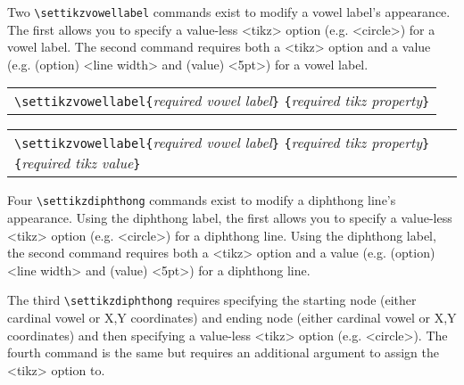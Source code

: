 \documentclass{article}
\newcommand{\pkg}[1]{\texttt{#1}}
\def\\{}%
\def\texttt#1{<#1>}%
\begin{document}
\bigskip
\noindent
Two \verb|\settikzvowellabel| commands exist to modify a vowel label's appearance.  The first allows you to specify a value-less \pkg{tikz} option (e.g. \texttt{circle}) for a vowel label.  The second command requires both a \pkg{tikz} option and a value (e.g. (option) \texttt{line width} and (value) \texttt{5pt}) for a vowel label.
\begin{center}
	\begin{tabular}{l}
		\begin{minipage}[t]{0.85\textwidth}
			{\small
				\verb|\settikzvowellabel{|\textit{required vowel label}\verb|}|\\
				\hspace*{10em}\verb|{|\textit{required tikz property}\verb|}|
			}
		\end{minipage} \\
	\end{tabular}
\end{center}
\begin{center}
	\begin{tabular}{l}
		\begin{minipage}[t]{0.85\textwidth}
			{\small
				\verb|\settikzvowellabel{|\textit{required vowel label}\verb|}|\\
				\hspace*{10em}\verb|{|\textit{required tikz property}\verb|}|\\
				\hspace*{10em}\verb|{|\textit{required tikz value}\verb|}|
			}
		\end{minipage} \\
	\end{tabular}
\end{center}

\bigskip
\noindent
Four \verb|\settikzdiphthong| commands exist to modify a diphthong line's appearance.  Using the diphthong label, the first allows you to specify a value-less \pkg{tikz} option (e.g. \texttt{circle}) for a diphthong line.  Using the diphthong label, the second command requires both a \pkg{tikz} option and a value (e.g. (option) \texttt{line width} and (value) \texttt{5pt}) for a diphthong line.

The third \verb|\settikzdiphthong| requires specifying the starting node (either cardinal vowel or X,Y coordinates) and ending node (either cardinal vowel or X,Y coordinates) and then specifying a value-less \pkg{tikz} option (e.g. \texttt{circle}).  The fourth command is the same but requires an additional argument to assign the \pkg{tikz} option to.
\end{document}
